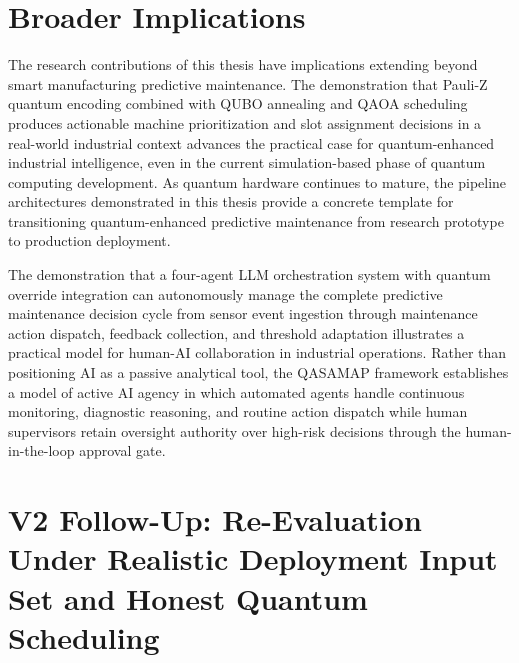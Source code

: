 \section{Broader Implications}

The research contributions of this thesis have implications extending beyond smart manufacturing predictive maintenance. The demonstration that Pauli-Z quantum encoding combined with QUBO annealing and QAOA scheduling produces actionable machine prioritization and slot assignment decisions in a real-world industrial context advances the practical case for quantum-enhanced industrial intelligence, even in the current simulation-based phase of quantum computing development. As quantum hardware continues to mature, the pipeline architectures demonstrated in this thesis provide a concrete template for transitioning quantum-enhanced predictive maintenance from research prototype to production deployment.

The demonstration that a four-agent LLM orchestration system with quantum override integration can autonomously manage the complete predictive maintenance decision cycle from sensor event ingestion through maintenance action dispatch, feedback collection, and threshold adaptation illustrates a practical model for human-AI collaboration in industrial operations. Rather than positioning AI as a passive analytical tool, the QASAMAP framework establishes a model of active AI agency in which automated agents handle continuous monitoring, diagnostic reasoning, and routine action dispatch while human supervisors retain oversight authority over high-risk decisions through the human-in-the-loop approval gate.

\section{V2 Follow-Up: Re-Evaluation Under Realistic Deployment Input Set and Honest Quantum Scheduling}
\label{sec:v2_followup_conclusion}

